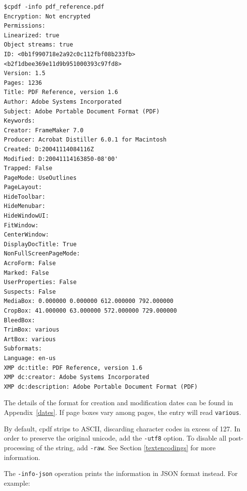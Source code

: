 \documentclass{book}
\begin{document}
\begin{framed}
{\small\begin{verbatim}
$cpdf -info pdf_reference.pdf
Encryption: Not encrypted
Permissions: 
Linearized: true
Object streams: true
ID: <0b1f990718e2a92c0c112fbf08b233fb> <b2f1dbee369e11d9b951000393c97fd8>
Version: 1.5
Pages: 1236
Title: PDF Reference, version 1.6
Author: Adobe Systems Incorporated
Subject: Adobe Portable Document Format (PDF)
Keywords: 
Creator: FrameMaker 7.0
Producer: Acrobat Distiller 6.0.1 for Macintosh
Created: D:20041114084116Z
Modified: D:20041114163850-08'00'
Trapped: False
PageMode: UseOutlines
PageLayout: 
HideToolbar: 
HideMenubar: 
HideWindowUI: 
FitWindow: 
CenterWindow: 
DisplayDocTitle: True
NonFullScreenPageMode: 
AcroForm: False
Marked: False
UserProperties: False
Suspects: False
MediaBox: 0.000000 0.000000 612.000000 792.000000
CropBox: 41.000000 63.000000 572.000000 729.000000
BleedBox: 
TrimBox: various
ArtBox: various
Subformats: 
Language: en-us
XMP dc:title: PDF Reference, version 1.6
XMP dc:creator: Adobe Systems Incorporated
XMP dc:description: Adobe Portable Document Format (PDF)
\end{verbatim}}\end{framed}
\noindent The details of the format for creation and modification dates can be found in
Appendix~\ref{dates}. If page boxes vary among pages, the entry will read \texttt{various}.

By default, cpdf strips to ASCII, discarding character codes in excess of 127. In order to preserve the original unicode, add the \texttt{-utf8} option. To disable all post-processing of the string, add \texttt{-raw}. See Section \ref{textencodings} for more information.

The \texttt{-info-json} operation prints the information in JSON format instead. For example:
\end{document}

